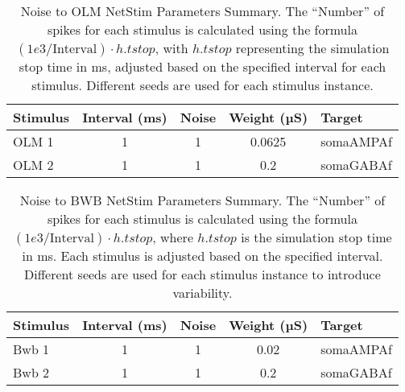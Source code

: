 \begin{table}[htbp]
    \centering
    \caption[Noise to OLM Parameters]{Noise to OLM NetStim Parameters Summary.
        The ``Number'' of spikes for each stimulus is calculated using the formula \((1e3 / \text{Interval}) \cdot h.tstop\),
        with \(h.tstop\) representing the simulation stop time in ms,
        adjusted based on the specified interval for each stimulus.
        Different seeds are used for each stimulus instance.}\label{tab:noise_to_OLM}
    \begin{tabular}{lcccl}
        \hline
        \textbf{Stimulus} & \textbf{Interval (ms)} & \textbf{Noise} & \textbf{Weight (µS)} & \textbf{Target} \\
        \hline
        OLM 1             & 1                      & 1              & 0.0625               & somaAMPAf       \\
        OLM 2             & 1                      & 1              & 0.2                  & somaGABAf       \\
        \hline
    \end{tabular}
\end{table}

\begin{table}[htbp]
    \centering
    \caption[Noise to BWB Parameters]{Noise to BWB NetStim Parameters Summary.
        The ``Number'' of spikes for each stimulus is calculated using the formula \((1e3 / \text{Interval}) \cdot h.tstop\),
        where \(h.tstop\) is the simulation stop time in ms. Each stimulus is adjusted based on the specified interval.
        Different seeds are used for each stimulus instance to introduce variability.}\label{tab:noise_to_BWB}
    \begin{tabular}{lcccl}
        \hline
        \textbf{Stimulus} & \textbf{Interval (ms)} & \textbf{Noise} & \textbf{Weight (µS)} & \textbf{Target} \\
        \hline
        Bwb 1             & 1                      & 1              & 0.02                 & somaAMPAf       \\
        Bwb 2             & 1                      & 1              & 0.2                  & somaGABAf       \\
        \hline
    \end{tabular}
\end{table}

